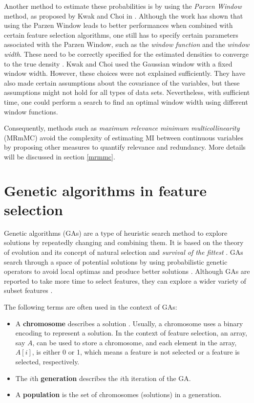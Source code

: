 \documentclass[12pt, twoside, a4paper]{report}
\begin{document}
Another method to estimate these probabilities is by using the \textit{Parzen Window} method, as proposed by Kwak and Choi in \cite{RefWorks:183}. Although the work has shown that using the Parzen Window leads to better performances when combined with certain feature selection algorithms, one still has to specify certain parameters associated with the Parzen Window, such as the \textit{window function} and the \textit{window width}. These need to be correctly specified for the estimated densities to converge to the true density \cite{RefWorks:184}. Kwak and Choi used the Gaussian window with a fixed window width. However, these choices were not explained sufficiently. They have also made certain assumptions about the covariance of the variables, but these assumptions might not hold for all types of data sets. Nevertheless, with sufficient time, one could perform a search to find an optimal window width using different window functions.

Consequently, methods such as \textit{maximum relevance minimum multicollinearity} (MRmMC) \cite{RefWorks:187} avoid the complexity of estimating MI between continuous variables by proposing other measures to quantify relevance and redundancy. More details will be discussed in section \ref{mrmmc}.

\section{Genetic algorithms in feature selection} \label{bg:fs:ga}

Genetic algorithms (GAs) are a type of heuristic search method to explore solutions by repeatedly changing and combining them. It is based on the theory of evolution and its concept of natural selection and \textit{survival of the fittest} \cite{RefWorks:205}. GAs search through a space of potential solutions by using probabilistic genetic operators to avoid local optimas and produce better solutions \cite{RefWorks:210, RefWorks:207, RefWorks:211}. Although GAs are reported to take more time to select features, they can explore a wider variety of subset features \cite{RefWorks:232}.

The following terms are often used in the context of GAs:
\begin{itemize}
  \item A \textbf{chromosome} describes a solution \cite{RefWorks:205, RefWorks:209}. Usually, a chromosome uses a binary encoding to represent a solution. In the context of feature selection, an array, say $A$, can be used to store a chromosome, and each element in the array, $A[i]$, is either 0 or 1, which means a feature is not selected or a feature is selected, respectively.
  
  \item The $i$th \textbf{generation} describes the $i$th iteration of the GA.
  
  \item A \textbf{population} is the set of chromosomes (solutions) in a generation.
\end{itemize}
\end{document}
